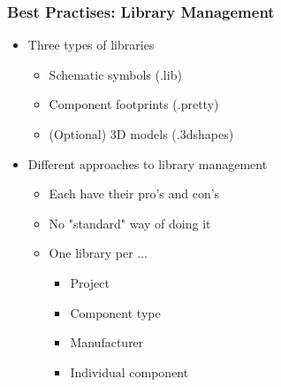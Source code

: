 \documentclass{beamer}
\begin{document}
\begin{frame}
  \frametitle{Best Practises: Library Management}
  \begin{itemize}
    \item Three types of libraries
    \begin{itemize}
      \item Schematic symbols (.lib)
      \item Component footprints (.pretty)
      \item (Optional) 3D models (.3dshapes)
    \end{itemize}
    \item Different approaches to library management
    \begin{itemize}
      \item Each have their pro's and con's
      \item No "standard" way of doing it
      \item One library per ...
      \begin{itemize}
        \item Project
        \item Component type
        \item Manufacturer
        \item Individual component
      \end{itemize}
    \end{itemize}
  \end{itemize}
\end{frame}
\end{document}
